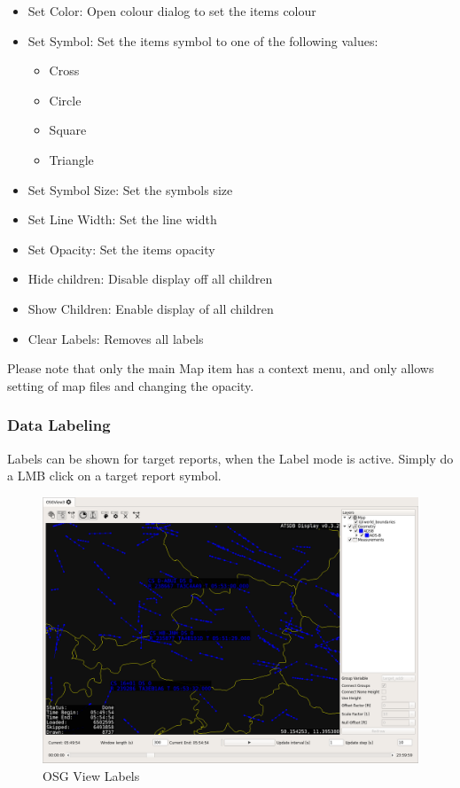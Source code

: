 {\begin{itemize}
 \item Set Color: Open colour dialog to set the items colour
 \item Set Symbol: Set the items symbol to one of the following values:
\begin{itemize}
 \item Cross
 \item Circle
 \item Square
 \item Triangle
\end{itemize}
 \item Set Symbol Size: Set the symbols size
 \item Set Line Width: Set the line width
 \item Set Opacity: Set the items opacity
 \item Hide children: Disable display off all children
 \item Show Children: Enable display of all children
 \item Clear Labels: Removes all labels
\end{itemize}

Please note that only the main Map item has a context menu, and only allows setting of map files and changing the opacity.

\subsubsection{Data Labeling}

Labels can be shown for target reports, when the Label mode is active. Simply do a LMB click on a target report symbol.

\begin{figure}[H]
    \hspace*{-2cm}
    \includegraphics[width=18cm,frame]{../screenshots/osgview_labels.png}
  \caption{OSG View Labels}
\end{figure}

}
